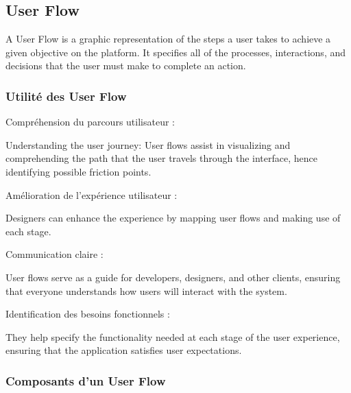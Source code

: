 \subsection{User Flow}
A User Flow is a graphic representation of the steps a user takes to achieve a given objective on the platform. It specifies all of the processes, interactions, and decisions that the user must make to complete an action.


\subsubsection {Utilité des User Flow}

\begin{description} \item[Compréhension du parcours utilisateur :]\end{description} 
Understanding the user journey: User flows assist in visualizing and comprehending the path that the user travels through the interface, hence identifying possible friction points.
\begin{description} \item[Amélioration de l'expérience utilisateur :]\end{description} 
Designers can enhance the experience by mapping user flows and making use of each stage.
\begin{description} \item[Communication claire :]\end{description} 
User flows serve as a guide for developers, designers, and other clients, ensuring that everyone understands how users will interact with the system.
\begin{description} \item[Identification des besoins fonctionnels :]\end{description} 
They help specify the functionality needed at each stage of the user experience, ensuring that the application satisfies user expectations.

\subsubsection {Composants d'un User Flow}

